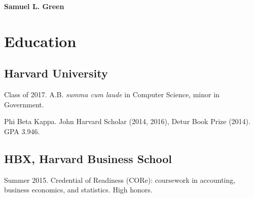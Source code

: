 \documentclass[letterpaper]{amsart}
\def\name{Samuel L. Green}
\renewenvironment{itemize}{
  \begin{list}{}{
    \setlength{\leftmargin}{1.5em}
  }
}{
  \end{list}
}
\begin{document}

\centerline{\huge \bf \name}

\vspace{0.1in}


\section*{Education}

\subsection*{Harvard University} 
\begin{itemize}
\item Class of 2017. A.B. \textit{summa cum laude} in Computer Science, minor in Government.
\item Phi Beta Kappa. John Harvard Scholar (2014, 2016), Detur Book Prize (2014).  GPA 3.946. 
\end{itemize}

\subsection*{HBX, Harvard Business School}
\begin{itemize}
\item{Summer 2015. Credential of Readiness (CORe): coursework in accounting, business economics, and statistics. High honors.}
\end{itemize}
\end{document}
